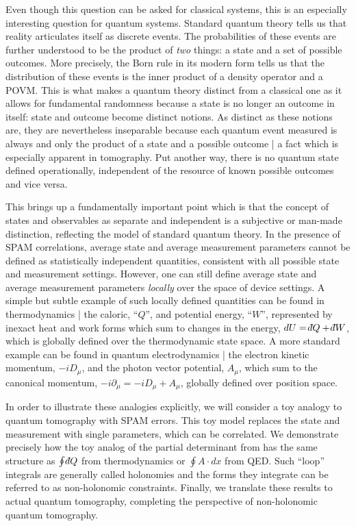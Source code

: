 \documentclass[pra, 10pt, notitlepage, twocolumn]{revtex4-1}
\def\dbar{{\mathchar'26\mkern-12mu d}}
\begin{document}
Even though this question can be asked for classical systems, this is an especially interesting question for quantum systems.
Standard quantum theory tells us that reality articulates itself as discrete events.
The probabilities of these events are further understood to be the product of \emph{two} things: a state and a set of possible outcomes.
More precisely, the Born rule in its modern form tells us that the distribution of these events is the inner product of a density operator and a POVM.
This is what makes a quantum theory distinct from a classical one as it allows for fundamental randomness because a state is no longer an outcome in itself:
state and outcome become distinct notions.
As distinct as these notions are, they are nevertheless inseparable because each quantum event measured is always and only the product of a state and a possible outcome
| a fact which is especially apparent in tomography.
Put another way, there is no quantum state defined operationally, independent of the resource of known possible outcomes and vice versa.

This brings up a fundamentally important point which is that the concept of states and observables as separate and independent is a subjective or man-made distinction,
reflecting the model of standard quantum theory.
In the presence of SPAM correlations, average state and average measurement parameters cannot be defined as statistically independent quantities,
consistent with all possible state and measurement settings.
However, one can still define average state and average measurement parameters \emph{locally} over the space of device settings.
A simple but subtle example of such locally defined quantities can be found in thermodynamics
| the caloric, ``$Q$'', and potential energy, ``$W$'', represented by inexact heat and work forms which sum to changes in the energy, $dU = \dbar Q + \dbar W$,
which is globally defined over the thermodynamic state space.
A more standard example can be found in quantum electrodynamics
| the electron kinetic momentum, $-i D_\mu$, and the photon vector potential, $A_\mu$, which sum to the canonical momentum, $-i\partial_\mu = -i D_\mu + A_\mu$,
globally defined over position space.

In order to illustrate these analogies explicitly, we will consider a toy analogy to quantum tomography with SPAM errors.
This toy model replaces the state and measurement with single parameters, which can be correlated.
We demonstrate precisely how the toy analog of the partial determinant from \cite{jackson2015detecting}
has the same structure as $\oint\dbar Q$ from thermodynamics or $\oint A\cdot dx$ from QED.
Such ``loop'' integrals are generally called holonomies and the forms they integrate can be referred to as non-holonomic constraints.
Finally, we translate these results to actual quantum tomography, completing the perspective of non-holonomic quantum tomography.
\end{document}
